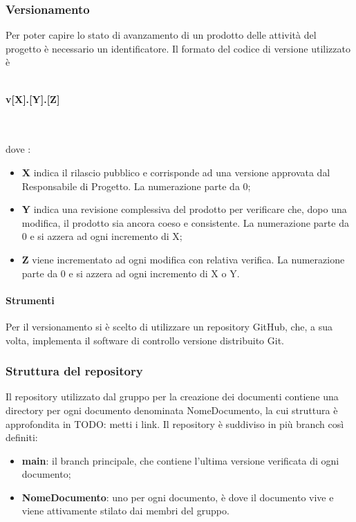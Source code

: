 \subsubsection{Versionamento}
Per poter capire lo stato di avanzamento di un prodotto delle attività del progetto è necessario un identificatore. Il formato del codice di versione utilizzato è \\ \\
\centerline{\textbf{v[X].[Y].[Z]}} \\ \\
dove :
\begin{itemize}
\item \textbf{X} indica il rilascio pubblico e corrisponde ad una versione approvata dal Responsabile di Progetto. La numerazione parte da 0;
\item \textbf{Y} indica una revisione complessiva del prodotto per verificare che, dopo una modifica, il prodotto sia ancora coeso e consistente. La numerazione parte da 0 e si azzera ad ogni incremento di X;
\item \textbf{Z} viene incrementato ad ogni modifica con relativa verifica. La numerazione parte da 0 e si azzera ad ogni incremento di X o Y.
\end{itemize}

\paragraph{Strumenti}
Per il versionamento si è scelto di utilizzare un repository GitHub, che, a sua volta, implementa il software di controllo versione distribuito Git.

\subsubsection{Struttura del repository}
Il repository utilizzato dal gruppo per la creazione dei documenti contiene una directory per ogni documento denominata NomeDocumento, la cui struttura è approfondita in TODO: metti i link.
Il repository è suddiviso in più branch così definiti:
\begin{itemize}
\item \textbf{main}: il branch principale, che contiene l'ultima versione verificata di ogni documento;
\item \textbf{NomeDocumento}: uno per ogni documento, è dove il documento vive e viene attivamente stilato dai membri del gruppo.
\end{itemize}

